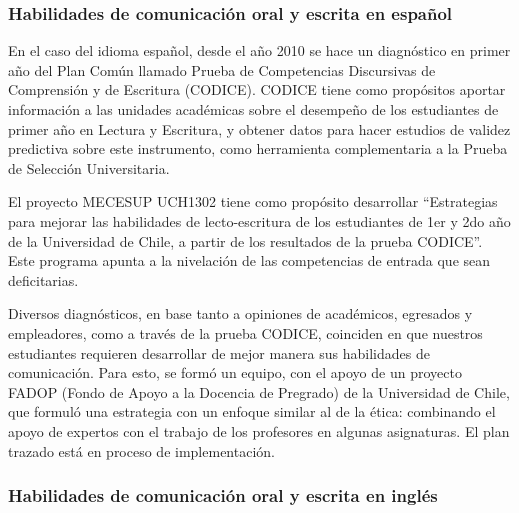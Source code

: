 \subsubsection{Habilidades de comunicación oral y escrita en español}

En el caso del idioma español, desde el año 2010 se hace un diagnóstico en primer año del Plan
Común llamado Prueba de Competencias Discursivas de Comprensión y de Escritura (CODICE).
CODICE tiene como propósitos aportar información a las unidades académicas sobre el desempeño
de los estudiantes de primer año en Lectura y Escritura, y obtener datos para hacer estudios
de validez predictiva sobre este instrumento, como herramienta complementaria a la Prueba de
Selección Universitaria.

El proyecto MECESUP UCH1302 tiene como propósito desarrollar ``Estrategias para mejorar
las habilidades de lecto-escritura de los estudiantes de 1er y 2do año de la Universidad de Chile,
a partir de los resultados de la prueba CODICE''. Este programa apunta a la nivelación de las
competencias de entrada que sean deficitarias.

Diversos diagnósticos, en base tanto a opiniones de académicos, egresados y empleadores,
como a través de la prueba CODICE, coinciden en que nuestros estudiantes requieren desarrollar
de mejor manera sus habilidades de comunicación. Para esto, se formó un equipo, con el apoyo de
un proyecto FADOP (Fondo de Apoyo a la Docencia de Pregrado) de la Universidad de Chile, que
formuló una estrategia con un enfoque similar al de la ética: combinando el apoyo de expertos
con el trabajo de los profesores en algunas asignaturas. El plan trazado está en proceso de
implementación.

\subsubsection{Habilidades de comunicación oral y escrita en inglés}

